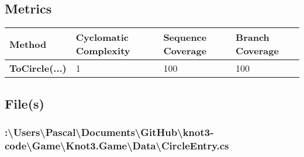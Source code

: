 \documentclass[a4paper,10pt]{article}
\begin{document}
\subsection{Metrics}
\begin{longtable}[l]{|l|l|l|l|}
\hline
\textbf{Method} & \textbf{Cyclomatic Complexity} & \textbf{Sequence Coverage} & \textbf{Branch Coverage}\\
\hline
\textbf{ToCircle(...)} & 1 & 100 & 100\\
\hline
\end{longtable}
\subsection{File(s)}
\subsubsection{:\textbackslash Users\textbackslash Pascal\textbackslash Documents\textbackslash GitHub\textbackslash knot3-code\textbackslash Game\textbackslash Knot3.Game\textbackslash Data\textbackslash CircleEntry.cs}
\end{document}
